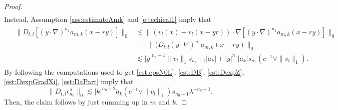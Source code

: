 \documentclass[10pt,a4paper]{amsart}
\numberwithin{equation}{section}
\numberwithin{corollario}{section}
\numberwithin{lemma}{section}
\numberwithin{prop}{section}
\theoremstyle{definition}
\theoremstyle{remark}
\begin{document}
\begin{proof}
\begin{align}
\end{align}
Instead, Assumption \ref{ass:estimateAmk} and \eqref{e:techical1} imply that
\begin{align}
    &\label{est:DaPart}\begin{aligned}
        \|D_{t,l}[(y\cdot \nabla)^{n_1}a_{m,k}(x-ry)]\|_0&\lesssim\|(v_l(x)-v_l(x-yr))\cdot \nabla [(y\cdot \nabla)^{n_1}a_{m,k}(x-ry)]\|_0\\
        &\quad+\|(D_{t,l}(y\cdot \nabla)^{n_1}a_{m,k}(x-ry)\|_0\\
        &\lesssim |y|^{n_1+1}\|v_l\|_1s_{n_1+1}|\mathring{a}_k|+|y|^{n_1}|\mathring{a}_k|s_{n_1}(c^{-1}\vee \|v_l\|_1).
    \end{aligned}
\end{align}
By following the computations used to get \eqref{est:epsN0L}, \eqref{est:DB}, \eqref{est:DexpZ}, \eqref{est:DexpGradXi}, \eqref{est:DaPart} imply that 
\begin{equation}\label{est:DepsN0L}
    \|D_{t,l}\epsilon^{\lambda}_{n_0}\|_0\lesssim |k|^{n_0+2}\mathring{a}_k(c^{-1}\vee \|v_l\|_1)s_{n_0+1}\lambda^{-n_0-1}.
\end{equation}
Then, the claim follows by just summing up in $m$ and $k$.
\end{proof}


{}

\end{document}
